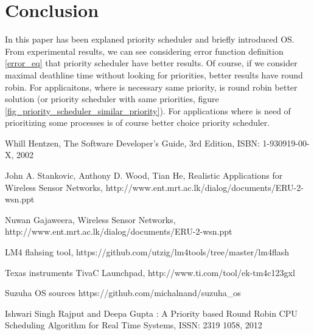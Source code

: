 \documentclass[conference]{IEEEtran}
\begin{document}
\section{Conclusion}
In this paper has been explaned priority scheduler and briefly introduced OS. From experimental results, we can see considering error function definition \ref{error_eq} that priority scheduler have better results. Of course, if we consider maximal deathline time without looking for priorities, better results have round robin. For applicaitons, where is necessary same priority, is round robin better solution (or priority scheduler with same priorities, figure \ref{fig_priority_scheduler_similar_priority}). For applications where is need of prioritizing some processes is of course better choice priority scheduler.



\balance

 
\begin{thebibliography}{99}

 Whill Hentzen, The Software Developer's Guide, 3rd Edition, ISBN: 1-930919-00-X, 2002


 John A. Stankovic, Anthony D. Wood, Tian He, Realistic Applications for Wireless Sensor Networks, http://www.ent.mrt.ac.lk/dialog/documents/ERU-2-wsn.ppt

 Nuwan Gajaweera, Wireless Sensor Networks, http://www.ent.mrt.ac.lk/dialog/documents/ERU-2-wsn.ppt

 LM4 flahsing tool, https://github.com/utzig/lm4tools/tree/master/lm4flash

 Texas instruments TivaC Launchpad, http://www.ti.com/tool/ek-tm4c123gxl

Suzuha OS sources https://github.com/michalnand/suzuha\_os

 Ishwari Singh Rajput and Deepa Gupta : A Priority based Round Robin CPU Scheduling Algorithm for Real Time Systems, ISSN: 2319 1058, 2012


\end{thebibliography}
\end{document}

